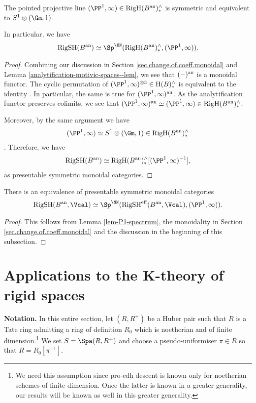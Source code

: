 \documentclass[colorinlistoftodos,article,11pt,reqno]{article}
\newcommand{\RigSH}{\textup{RigSH}}
\newcommand{\RigH}{\textup{RigH}}
\newcommand{\eff}{\textup{eff}}
\newcommand{\an}{\textup{an}}
\begin{document}
\begin{lem}
\label{lem-P1-spectrum}
    The pointed projective line $(\PP^1,\infty)\in \RigH(B^\an)^{\wedge}_*$ is symmetric and equivalent to $S^1\otimes (\Gm,1)$.

    In particular, we have 
    $$
        \RigSH(B^{\an})\simeq \Sp^\NN(\RigH(B^\an)^{\wedge}_*,(\PP^1,\infty)).
    $$
\end{lem}
\begin{proof}
    Combining our discussion in Section \ref{sec.change.of.coeff.monoidal} and Lemma \ref{analytification-motivic-spaces--lem}, we see that  $(-)^{\an}$ is a monoidal functor. The cyclic permutation of $(\PP^1,\infty)^{\otimes 3}\in  \textup{H}(B)^\wedge_*$ is equivalent to the identity \cite[Lem. 4.4]{voevodsky-icm-1998}. In particular, the same is true for $(\PP^{1},\infty)^{\an}$. As the analytification functor preserves colimits, we see that $(\PP^{1},\infty)^{\an}\simeq (\PP^1,\infty)\in \RigH(B^\an)^{\wedge}_*$.

    Moreover, by the same argument we have 
    $$
        (\PP^1,\infty)\simeq S^1\otimes(\Gm,1)\in \RigH(B^\an)^{\wedge}_*
    $$
    \cite[Lem. 2.15]{MV1}. Therefore, we have 
$$
    \RigSH(B^\an)\simeq \RigH(B^\an)^{\wedge}_*[(\PP^1,\infty)^{-1}],
 $$
as presentable symmetric monoidal categories.
\end{proof}

\begin{cor}
    There is an equivalence of presentable symmetric monoidal categories 
    $$
        \RigSH(B^{\an},\Vcal)\simeq \Sp^\NN(\RigSH^{\eff}(B^\an,\Vcal),(\PP^1,\infty)).
    $$
\end{cor}
\begin{proof}
    This follows from Lemma \ref{lem-P1-spectrum}, the monoidality in Section \ref{sec.change.of.coeff.monoidal} and the discussion in the beginning of this subsection.
\end{proof}

 



\section{Applications to the K-theory of rigid spaces}
\localtableofcontents
\vspace{6pt}\noindent\textbf{Notation.}
In this entire section, let $(R,R^+)$ be a Huber pair such that $R$ is a Tate ring admitting a ring of definition $R_0$ which is noetherian and of finite dimension.\footnote{We need this assumption since pro-cdh descent is known only for noetherian schemes of finite dimension. Once the latter is known in a greater generality, our results will be known as well in this greater generality.}
We set $S=\Spa(R,R^+)$ and choose a pseudo-uniformiser $\pi\in R$ so that $R=R_0[\pi^{-1}]$.
\end{document}

